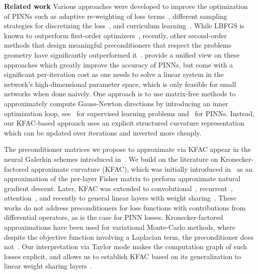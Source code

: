\textbf{Related work}
Various approaches were developed to improve the optimization of PINNs such as adaptive re-weighting of loss terms~\citep{wang2021understanding,van2022optimally,wang2022and}, different sampling strategies for discretizing the loss~\citep{lu2021deepxde, nabian2021efficient, daw2022rethinking,zapf2022investigating, wang2022respecting, wu2023comprehensive}, and curriculum learning~\citep{krishnapriyan2021characterizing, wang2022respecting}.
While LBFGS is known to outperform first-order optimizers~\citep{markidis2021old},
recently, other second-order methods that design meaningful preconditioners that respect the problems geometry have significantly outperformed it~\cite{zeng2022competitive, muller2023achieving, de2023operator, liu2024preconditioning, jnini2024gauss,chen2024teng, zampini2024petscml}.
\citet{muller2024optimization} provide a unified view on these approaches which greatly improve the accuracy of PINNs, but come with a significant per-iteration cost as one needs to solve a linear system in the network's high-dimensional parameter space, which is only feasible for small networks when done naively.
One approach is to use matrix-free methods to approximately compute Gauss-Newton directions by introducing an inner optimization loop, see~\cite{schraudolph2002fast,martens2010deep} for supervised learning problems and~\cite{zeng2022competitive,bonfanti2024challenges, jnini2024gauss,zampini2024petscml} for PINNs.
Instead, our KFAC-based approach uses an explicit structured curvature representation which can be updated over iterations and inverted more cheaply.

The preconditioner matrices we propose to approximate via KFAC appear in the neural Galerkin schemes introduced in~\citet{bruna2024neural}.
We build on the literature on Kronecker-factored approximate curvature (KFAC), which was initially introduced in~\citet{heskes2000natural,martens2010deep} as an approximation of the per-layer Fisher matrix to perform approximate natural gradient descent.
Later, KFAC was extended to convolutional~\citep{grosse2016kroneckerfactored}, recurrent~\citep{martens2018kroneckerfactored}, attention~\citep{pauloski2021kaisa,osawa2023pipefisher,grosse2023studying}, and recently to general linear layers with weight sharing~\cite{eschenhagen2023kroneckerfactored}.
These works do not address preconditioners for loss functions with contributions from differential operators, as is the case for PINN losses.
Kronecker-factored approximations have been used for variational Monte-Carlo methods, where despite the objective function involving a Laplacian term, the preconditioner does not~\citep{pfau2020ab,drissi2024second}.
Our interpretation via Taylor mode makes the computation graph of such losses explicit, and allows us to establish KFAC based on its generalization to linear weight sharing layers~\cite{eschenhagen2023kroneckerfactored}.

